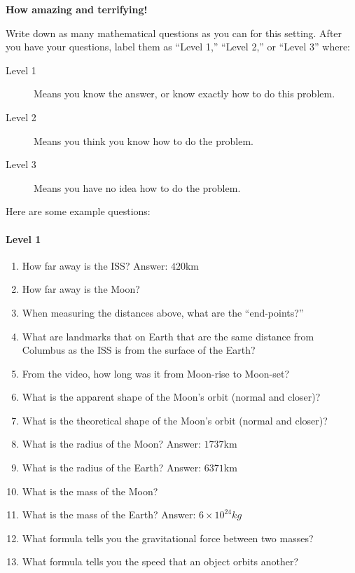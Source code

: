 \documentclass{ximera}
\begin{document}
\begin{center}
\textbf{How amazing and terrifying!}
\end{center}
\begin{problem}
     Write down as many mathematical questions as you can for this
     setting. After you have your questions, label them as ``Level
     1,'' ``Level 2,'' or ``Level 3'' where:
\begin{description}
\item[Level 1] Means you know the answer, or know exactly how to do
  this problem.
\item[Level 2] Means you think you know how to do the problem.
\item[Level 3] Means you have no idea how to do the problem.
\end{description}
\begin{freeResponse}
  Here are some example questions:
  \paragraph{Level 1}
  \begin{enumerate}
  \item How far away is the ISS? Answer: $420$km
  \item How far away is the Moon? 
  \item When measuring the distances above, what are the ``end-points?''
  \item What are landmarks that on Earth that are the same distance
    from Columbus as the ISS is from the surface of the Earth?
  \item From the video, how long was it from Moon-rise to Moon-set?
  \item What is the apparent shape of the Moon's orbit (normal and
    closer)?
  \item What is the theoretical shape of the Moon's orbit (normal and
    closer)?
  \item What is the radius of the Moon? Answer: $1737$km
  \item What is the radius of the Earth? Answer: $6371$km
  \item What is the mass of the Moon?
  \item What is the mass of the Earth? Answer: $6\times 10^{24}kg$
  \item What formula tells you the gravitational force between two
    masses?
  \item What formula tells you the speed that an object orbits another?
  \end{enumerate}


\end{freeResponse}
\end{problem}
\end{document}
